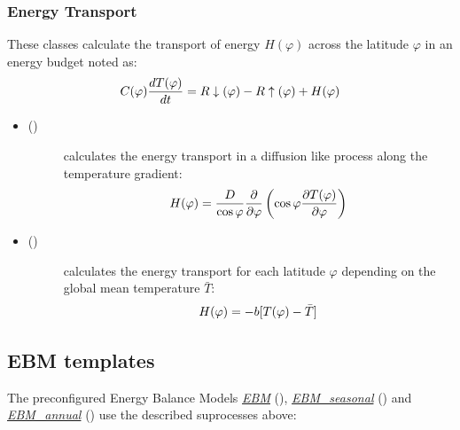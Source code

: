 \documentclass[a4paper,10pt,english]{sphinxmanual}
\begin{document}
\subsubsection{Energy Transport}
\label{models:energy-transport}
These classes calculate the transport of energy \(H(\varphi)\) across the latitude \(\varphi\) in an energy budget noted as:
\begin{gather}
\begin{split}C(\varphi) \frac{dT(\varphi)}{dt} = R\downarrow (\varphi) - R\uparrow (\varphi) + H(\varphi)\end{split}\notag
\end{gather}\begin{itemize}
\item {} \begin{description}
\item[{{\hyperref[api/climlab.dynamics:climlab.dynamics.diffusion.MeridionalDiffusion]{\emph{}}} ()}] \leavevmode
calculates the energy transport in a diffusion like process along the temperature gradient:
\begin{gather}
\begin{split}H(\varphi) = \frac{D}{\cos \varphi}\frac{\partial}{\partial \varphi} \left( \cos\varphi \frac{\partial T(\varphi)}{\partial \varphi} \right)\end{split}\notag
\end{gather}
\end{description}

\item {} \begin{description}
\item[{{\hyperref[api/climlab.dynamics:climlab.dynamics.budyko_transport.BudykoTransport]{\emph{}}} ()}] \leavevmode
calculates the energy transport for each latitude \(\varphi\) depending on the global mean temperature \(\bar{T}\):
\begin{gather}
\begin{split}H(\varphi) = - b [T(\varphi) - \bar{T}]\end{split}\notag
\end{gather}
\end{description}

\end{itemize}


\subsection{EBM templates}
\label{models:ebm-templates}
The preconfigured Energy Balance Models {\hyperref[models:ebm]{\emph{EBM}}} (), {\hyperref[models:ebm\string-seasonal]{\emph{EBM\_seasonal}}} () and {\hyperref[models:ebm\string-annual]{\emph{EBM\_annual}}} () use the described suprocesses above:
\end{document}
